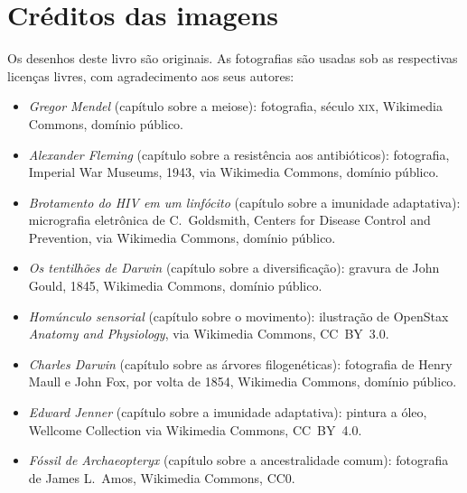 \chapter*{Créditos das imagens}

\begingroup\sloppy

Os desenhos deste livro são originais. As fotografias são usadas sob
as respectivas licenças livres, com agradecimento aos seus autores:

\begin{itemize}
  \item \emph{Gregor Mendel} (capítulo sobre a meiose): fotografia,
        século \textsc{xix}, Wikimedia Commons, domínio público.
  \item \emph{Alexander Fleming} (capítulo sobre a resistência aos
        antibióticos): fotografia, Imperial War Museums, 1943, via
        Wikimedia Commons, domínio público.
  \item \emph{Brotamento do HIV em um linfócito} (capítulo sobre a
        imunidade adaptativa): micrografia eletrônica de
        C.~Goldsmith, Centers for Disease Control and Prevention, via
        Wikimedia Commons, domínio público.
  \item \emph{Os tentilhões de Darwin} (capítulo sobre a
        diversificação): gravura de John Gould, 1845, Wikimedia
        Commons, domínio público.
  \item \emph{Homúnculo sensorial} (capítulo sobre o movimento):
        ilustração de OpenStax \emph{Anatomy and Physiology}, via
        Wikimedia Commons, CC~BY~3.0.
  \item \emph{Charles Darwin} (capítulo sobre as árvores
        filogenéticas): fotografia de Henry Maull e John Fox, por
        volta de 1854, Wikimedia Commons, domínio público.
  \item \emph{Edward Jenner} (capítulo sobre a imunidade adaptativa):
        pintura a óleo, Wellcome Collection via Wikimedia Commons,
        CC~BY~4.0.
  \item \emph{Fóssil de Archaeopteryx} (capítulo sobre a ancestralidade
        comum): fotografia de James L.~Amos, Wikimedia Commons, CC0.
\end{itemize}


